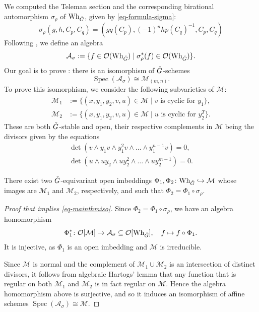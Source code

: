 \documentclass[11pt]{article}
\theoremstyle{definition}
\theoremstyle{plain}
\theoremstyle{remark}
\DeclareMathOperator{\spec}{Spec}
\begin{document}
        We computed the Teleman section and the corresponding birational automorphism $\sigma_\rho$ of $\mathrm{Wh}_{\Check{G}}$, given by \eqref{eq-formula-sigma}:
        \[
            \sigma_{\rho}(g,h,C_p,C_q) = (gq(C_p), (-1)^nhp(C_q)^{-1}, C_p, C_q)
        \]
        Following , we define an algebra
        \[
            \mathcal{A}_{\sigma} := \{f \in \mathcal{O}(\mathrm{Wh}_{\Check{G}}) \mid \sigma_{\rho}^*(f) \in \mathcal{O}(\mathrm{Wh}_{\Check{G}})\}.
        \]
        Our goal is to prove : there is an isomorphism of $\Check{G}$-schemes
        \begin{equation}\label{eq-mainthmiso}
            \spec(\mathcal{A}_\sigma) \cong \mathcal{M}_{(m,n)}.
        \end{equation}
        To prove this isomorphism, we consider the following subvarieties of $\mathcal{M}$:
        \begin{align}
            \mathcal{M}_1 &:= \{ (x,y_1,y_2,v,u) \in \mathcal{M} \mid v \text{ is cyclic for } y_1 \}, \label{eq-open1}\\
            \mathcal{M}_2 &:= \{ (x,y_1,y_2,v,u) \in \mathcal{M} \mid u \text{ is cyclic for } y_2^T \}. \label{eq-open2}
        \end{align}
        These are both $\Check{G}$-stable and open, their respective complements in $\mathcal{M}$ being the divisors given by the equations
        \begin{align*}
           \det(v \wedge y_1v \wedge y_1^2v \wedge \dots \wedge y_1^{n-1}v) = 0, \\
           \det(u \wedge uy_2 \wedge uy_2^2 \wedge \dots \wedge uy_2^{m-1}) = 0.
        \end{align*}

        \begin{prop}\label{prop-main}
            There exist two $\Check{G}$-equivariant open imbeddings $\Phi_1,\Phi_2 \colon \mathrm{Wh}_{\Check{G}} \hookrightarrow \mathcal{M}$ whose images are $\mathcal{M}_1$ and $\mathcal{M}_2$, respectively, and such that $\Phi_2 = \Phi_1 \circ \sigma_{\rho}$.
        \end{prop}
        
        \begin{proof}[Proof that  implies \eqref{eq-mainthmiso}]
            Since $\Phi_2 = \Phi_1 \circ \sigma_{\rho}$, we have an algebra homomorphism
            \[
                \Phi_1^*\colon \mathcal{O}[\mathcal{M}] \to \mathcal{A}_\sigma \subseteq \mathcal{O}[\mathrm{Wh}_{\Check{G}}],\quad f \mapsto f \circ \Phi_1.
            \]
            It is injective, as $\Phi_1$ is an open imbedding and $\mathcal{M}$ is irreducible.

            Since $\mathcal{M}$ is normal and the complement of $\mathcal{M}_1\cup\mathcal{M}_2$ is an intersection of distinct divisors, it follows from algebraic Hartogs' lemma that any function that is regular on both $\mathcal{M}_1$ and $\mathcal{M}_2$ is in fact regular on $\mathcal{M}$. Hence the algebra homomorphism above is surjective, and so it induces an isomorphism of affine schemes $\spec(\mathcal{A}_{\sigma}) \cong \mathcal{M}$.
        \end{proof}
\end{document}
